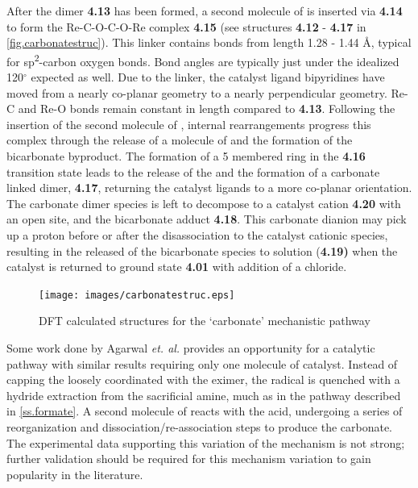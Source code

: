 After the dimer \textbf{4.13} has been formed, a second molecule of  is inserted via \textbf{4.14} to form the Re-C-O-C-O-Re complex \textbf{4.15} (see structures \textbf{4.12} - \textbf{4.17} in \autoref{fig.carbonatestruc}). This linker contains bonds from length 1.28 - 1.44 \r{A}, typical for sp\textsuperscript{2}-carbon oxygen bonds. Bond angles are typically just under the idealized 120$^\circ$ expected as well. Due to the linker, the catalyst ligand bipyridines have moved from a nearly co-planar geometry to a nearly perpendicular geometry. Re-C and Re-O bonds remain constant in length compared to \textbf{4.13}. Following the insertion of the second molecule of , internal rearrangements progress this complex through the release of a molecule of  and the formation of the bicarbonate byproduct. The formation of a 5 membered ring in the \textbf{4.16} transition state leads to the release of the  and the formation of a carbonate linked dimer, \textbf{4.17}, returning the catalyst ligands to a more co-planar orientation. The carbonate dimer species is left to decompose to a catalyst cation \textbf{4.20} with an open site, and the bicarbonate adduct \textbf{4.18}. This carbonate dianion may pick up a proton before or after the disassociation to the catalyst cationic species, resulting in the released of the bicarbonate species to solution (\textbf{4.19)} when the catalyst is returned to ground state \textbf{4.01} with addition of a chloride. 

\begin{figure}[!ht]
 \begin{center}
  \texttt{[image: images/carbonatestruc.eps]}
 \end{center}
\caption{DFT calculated structures for the `carbonate' mechanistic pathway}
\label{fig.carbonatestruc}
\end{figure} 


Some work done by Agarwal \textit{et. al.} provides an opportunity for a catalytic pathway with similar results requiring only one molecule of catalyst\autocite{agarwal2012a}. Instead of capping the loosely coordinated  with the eximer, the radical is quenched with a hydride extraction from the sacrificial amine, much as in the pathway described in \autoref{ss.formate}. A second molecule of  reacts with the acid, undergoing a series of reorganization and dissociation/re-association steps to produce the carbonate. The experimental data supporting this variation of the mechanism is not strong; further validation should be required for this mechanism variation to gain popularity in the literature. 

